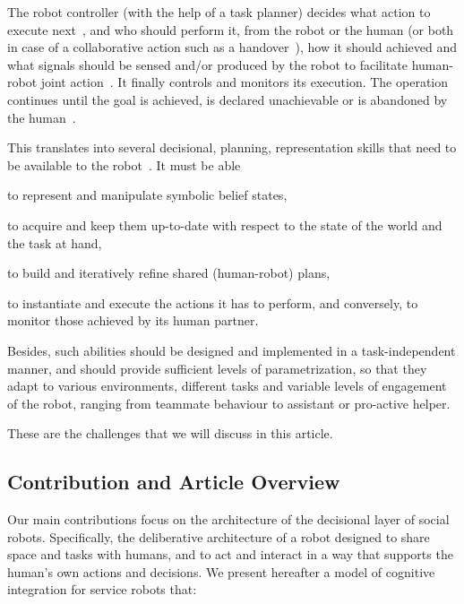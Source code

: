 \documentclass[preprint,3p,times]{elsarticle}
\begin{document}
The robot controller (with the help of a task planner) decides what action to
execute next~\cite{clodic2014key}, and who should perform it, from the robot or the human (or both in
case of a collaborative action such as a handover~\cite{Mainprice2012,waldhart2015planning}), how it should achieved and what signals should
be sensed and/or produced by the robot to facilitate human-robot joint action~\cite{sebanz2006joint,knoblich20113,pacherie2012phenomenology,vesper2010minimal}.
It finally controls and monitors its execution. The
operation continues until the goal is achieved, is declared unachievable or is
abandoned by the human~\cite{Klein2004}.


\begin{inparaenum}

This translates into several decisional, planning, representation skills that
need to be available to the robot~\cite{alami2011robot}. It must be able \item
to represent and manipulate symbolic belief states, \item to acquire and keep
them up-to-date with respect to the state of the world and the task at hand,
\item to build and iteratively refine shared (human-robot) plans, \item to
instantiate and execute the actions it has to perform, and conversely, to
monitor those achieved by its human partner.

\end{inparaenum}

Besides, such abilities should be designed and implemented in a task-independent
manner, and should provide sufficient levels of parametrization, so that they adapt to
various environments, different tasks and variable levels of engagement of the
robot, ranging from teammate behaviour to assistant or pro-active helper.

These are the challenges that we will discuss in this article.

\subsection{Contribution and Article Overview}

Our main contributions focus on the architecture of the decisional layer of
social robots. Specifically, the deliberative architecture of a robot designed
to share space and tasks with humans, and to act and interact in a way that
supports the human's own actions and decisions. We present hereafter a model of cognitive
integration for service robots that:
\end{document}
